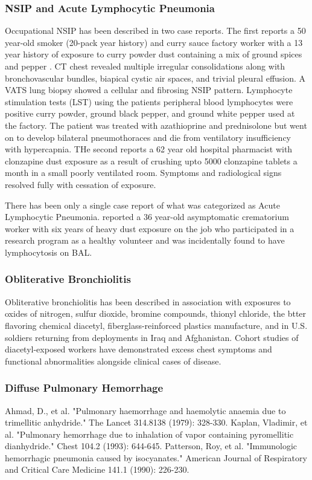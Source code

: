 \documentclass[a4
er,12pt]{article}
\begin{document}
\subsubsection{NSIP and Acute Lymphocytic Pneumonia}
Occupational NSIP has been described in two case reports. The first reports a 50 year-old smoker (20-pack year history) and curry sauce factory worker with a 13 year history of exposure to curry powder dust containing a mix of ground spices and pepper \cite{Ando2006} . CT chest revealed multiple irregular consolidations along with bronchovascular bundles, biapical cystic air spaces, and trivial pleural effusion. A VATS lung biopsy showed a cellular and fibrosing NSIP pattern. Lymphocyte stimulation tests (LST) using the patients peripheral blood lymphocytes were positive curry powder, ground black pepper, and ground white pepper used at the factory. The patient was treated with azathioprine and prednisolone but went on to develop bilateral pneumothoraces and die from ventilatory insufficiency with hypercapnia. THe second reports a 62 year old hospital pharmacist with clonzapine dust exposure as a result of crushing upto 5000 clonzapine tablets a month in a small poorly ventilated room. Symptoms and radiological signs resolved fully with cessation of exposure. \cite{Lewis2012}

There has been only a single case report of what was categorized as Acute Lymphocytic Pneumonia. \cite{Schauble1994} reported a 36 year-old asymptomatic crematorium worker with six years of heavy dust exposure on the job who participated in a research program as a healthy volunteer and was incidentally found to have lymphocytosis on BAL. 

\subsubsection{Obliterative Bronchiolitis}
Obliterative bronchiolitis has been described in association with exposures to oxides of nitrogen, sulfur dioxide, bromine compounds, thionyl chloride, the btter flavoring chemical diacetyl, fiberglass-reinforced plastics manufacture, and in U.S. soldiers returning from deployments in Iraq and Afghanistan.  Cohort studies of diacetyl-exposed workers have demonstrated excess chest symptoms and functional abnormalities alongside clinical cases of disease.

\subsubsection{Diffuse Pulmonary Hemorrhage}
Ahmad, D., et al. "Pulmonary haemorrhage and haemolytic anaemia due to trimellitic anhydride." The Lancet 314.8138 (1979): 328-330.
Kaplan, Vladimir, et al. "Pulmonary hemorrhage due to inhalation of vapor containing pyromellitic dianhydride." Chest 104.2 (1993): 644-645.
Patterson, Roy, et al. "Immunologic hemorrhagic pneumonia caused by isocyanates." American Journal of Respiratory and Critical Care Medicine 141.1 (1990): 226-230.
\end{document}
